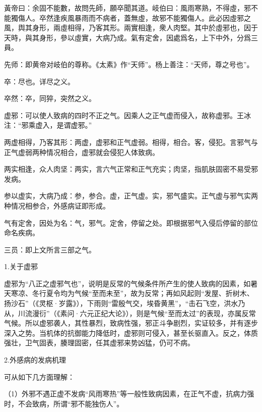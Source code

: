 \documentclass[draft,12pt]{ctexbook}
\begin{document}

\begin{yuanwen}
黃帝曰：余固不能數，故問先師，願卒聞其道。岐伯曰：風雨寒熟，不得虛，邪不能獨傷人。卒然逢疾風暴雨而不病者，蓋無虛，故邪不能獨傷人。此必因虛邪之風，舆其身形，兩虛相得，乃客其形。兩實相逢，衆人肉堅。其中於虛邪也，因于天時，與其身形，參以虛實，大病乃成。氣有定舍，因處爲名，上下中外，分爲三員。
\end{yuanwen}


\begin{jiaozhu}
	\item 先师：即黄帝对岐伯的尊称。《太素》作“天师”。杨上善注：“天师，尊之号也”。
	\item 卒：尽也。详尽之义。
	\item 卒然：卒，同猝，突然之义。
	\item 虚邪：可以使人致病的四时不正之气。因乘人之正气虚而侵入，故称虚邪。王冰注：“邪乘虚入，是谓虚邪。”
	\item 两虚相得，乃客其形：两虚，虚邪和正气虚弱。相得，相合。客，侵犯。言邪气与正气虚弱两种情况相合，虚邪就会侵犯人体致病。
	\item 两实相逢，众人肉坚：两实，言六气正常和正气充实；肉坚，指肌肤固密不易受邪发病。
	\item 参以虚实，大病乃成：参，参合。虚，正气虚。实，邪气盛实。正气虚与邪气实两种情况相参合，外感病证即形成。
	\item 气有定舍，因处为名：气，邪气。定舍，停留之处。即根据邪气入侵后停留的部位命名疾病。
	\item 三员：即上文所言三部之气。
\end{jiaozhu}


1.关于虚邪

虚邪为“八正之虚邪气也”，说明是反常的气候条件所产生的使人致病的因素，如暑天寒凉、冬行夏令均为气候“至而未至”，故为反常；再如风起则“发屋、折树木、扬沙石”（《灵枢·岁露》），下雨则“雷殷气交，埃昏黄黑”，“击石飞空，洪水乃从，川流漫衍”（《素问·六元正纪大论》），则是气候“至而太过”的表现，亦属反常气候。所以虚邪袭人，其性暴烈，致病性强，邪正斗争剧烈，实证较多，并有逐步深入之势。当机体的抗御能力降低时，虚邪则可侵入，甚至长驱直入。反之，体质强壮，卫气固表，腠理固密，任其虚邪来势凶猛，仍可不病。

2.外感病的发病机理

可从如下几方面理解：

（1）外邪不遇正虚不发病“风雨寒热”等一般性致病因素，在正气不虚，抗病力强时，不会致病，所谓“邪不能独伤人”。
\end{document}
